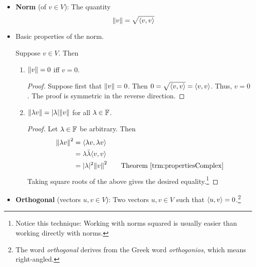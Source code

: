 \documentclass[../main.tex]{subfiles}
\begin{document}
\begin{itemize}
\begin{theorem}
\begin{enumerate}[label={\textup{(}\alph*\textup{)}},ref={\thetheorem\arabic*}]
\begin{proof}
\begin{align*}
                    \inp{u}{\lambda v} &= \overline{\inp{\lambda v}{u}}\\
                    &= \overline{\lambda\inp{v}{u}}\\
                    &= \bar{\lambda}\overline{\inp{v}{u}}\tag*{Theorem \ref{trm:propertiesComplex}}\\
                    &= \bar{\lambda}\inp{u}{v}
                \end{align*}
            \end{proof}
        \end{enumerate}
    \end{theorem}
    \item \textbf{Norm} (of $v\in V$): The quantity
    \begin{equation*}
        \norm{v} = \sqrt{\langle{v},{v}\rangle}
    \end{equation*}
    \item Basic properties of the norm.
    \begin{theorem}
        Suppose $v\in V$. Then
        \begin{enumerate}[label={\textup{(}\alph*\textup{)}}]
            \item $\norm{v}=0$ iff $v=0$.
            \begin{proof}
                Suppose first that $\norm{v}=0$. Then $0=\sqrt{\langle{v},{v}\rangle}=\langle{v},{v}\rangle$. Thus, $v=0$. The proof is symmetric in the reverse direction.
            \end{proof}
            \item $\norm{\lambda v}=|\lambda|\norm{v}$ for all $\lambda\in\mathbb{F}$.
            \begin{proof}
                Let $\lambda\in\mathbb{F}$ be arbitrary. Then
                \begin{align*}
                    \norm{\lambda v}^2 &= \inp{\lambda v}{\lambda v}\\
                    &= \lambda\bar{\lambda}\inp{v}{v}\\
                    &= |\lambda|^2\norm{v}^2\tag*{Theorem \ref{trm:propertiesComplex}}
                \end{align*}
                Taking square roots of the above gives the desired equality.\footnote{Notice this technique: Working with norms squared is usually easier than working directly with norms.}
            \end{proof}
        \end{enumerate}
    \end{theorem}
    \item \textbf{Orthogonal} (vectors $u,v\in V$): Two vectors $u,v\in V$ such that $\langle{u},{v}\rangle=0$.\footnote{The word \emph{orthogonal} derives from the Greek word \emph{orthogonios}, which means right-angled.}

\end{itemize}
\end{document}
